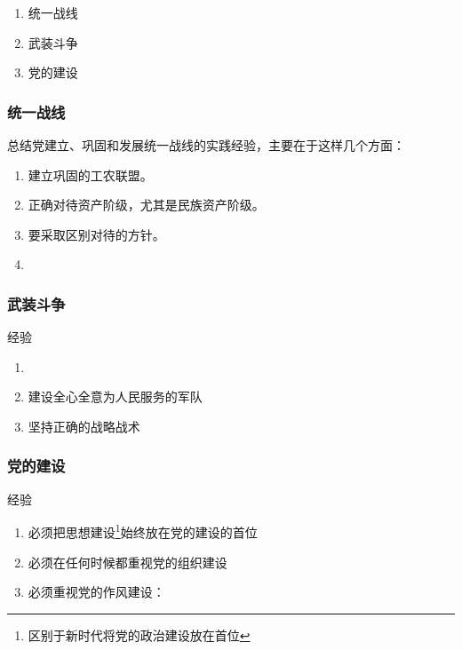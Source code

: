         \begin{enumerate}
            \item 统一战线
            \item 武装斗争
            \item 党的建设
        \end{enumerate}

        \subsubsection{统一战线}
        总结党建立、巩固和发展统一战线的实践经验，主要在于这样几个方面：
        \begin{enumerate}
            \item 建立巩固的工农联盟。
            \item 正确对待资产阶级，尤其是民族资产阶级。
            \item 要采取区别对待的方针。
            \item {}
        \end{enumerate}

        \subsubsection{武装斗争}
        经验
        \begin{enumerate}
            \item {}
            \item 建设全心全意为人民服务的军队
            \item 坚持正确的战略战术
        \end{enumerate}

        \subsubsection{党的建设}
        经验
        \begin{enumerate}
            \item 必须把思想建设\footnote{区别于新时代将党的政治建设放在首位}始终放在党的建设的首位
            \item 必须在任何时候都重视党的组织建设
            \item 必须重视党的作风建设：
        \end{enumerate}